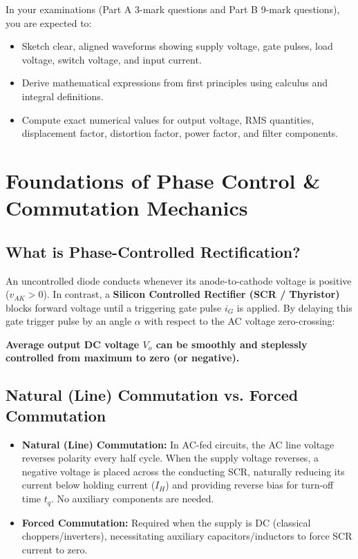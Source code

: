 \documentclass[11pt,a4paper]{article}
\begin{document}
\begin{conceptbox}
In your examinations (Part A 3-mark questions and Part B 9-mark questions), you are expected to:
\begin{itemize}[leftmargin=*]
  \item Sketch clear, aligned waveforms showing supply voltage, gate pulses, load voltage, switch voltage, and input current.
  \item Derive mathematical expressions from first principles using calculus and integral definitions.
  \item Compute exact numerical values for output voltage, RMS quantities, displacement factor, distortion factor, power factor, and filter components.
\end{itemize}
\end{conceptbox}

\section{Foundations of Phase Control \& Commutation Mechanics}

\subsection{What is Phase-Controlled Rectification?}
An uncontrolled diode conducts whenever its anode-to-cathode voltage is positive ($v_{AK} > 0$). In contrast, a \textbf{Silicon Controlled Rectifier (SCR / Thyristor)} blocks forward voltage until a triggering gate pulse $i_G$ is applied. 
By delaying this gate trigger pulse by an angle $\alpha$ with respect to the AC voltage zero-crossing:
\begin{conceptbox}
\centering\bfseries\color{navyprimary}
Average output DC voltage $V_o$ can be smoothly and steplessly controlled from maximum to zero (or negative).
\end{conceptbox}

\subsection{Natural (Line) Commutation vs. Forced Commutation}
\begin{itemize}[leftmargin=*]
  \item \textbf{Natural (Line) Commutation:} In AC-fed circuits, the AC line voltage reverses polarity every half cycle. When the supply voltage reverses, a negative voltage is placed across the conducting SCR, naturally reducing its current below holding current ($I_H$) and providing reverse bias for turn-off time $t_q$. No auxiliary components are needed.
  \item \textbf{Forced Commutation:} Required when the supply is DC (classical choppers/inverters), necessitating auxiliary capacitors/inductors to force SCR current to zero.
\end{itemize}
\end{document}
